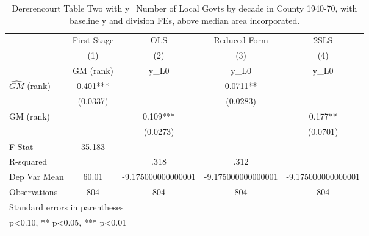 \begin{table}[htbp]\centering
\def\sym#1{\ifmmode^{#1}\else\(^{#1}\)\fi}
\caption{Dererencourt Table Two with y=Number of Local Govts by decade in County 1940-70, with baseline y and division FEs, above median area incorporated.}
\begin{tabular}{l*{4}{c}}
\toprule
                    & First Stage   &         OLS   &Reduced Form   &        2SLS   \\
                    &\multicolumn{1}{c}{(1)}&\multicolumn{1}{c}{(2)}&\multicolumn{1}{c}{(3)}&\multicolumn{1}{c}{(4)}\\
                    &\multicolumn{1}{c}{GM  (rank)}&\multicolumn{1}{c}{y\_L0}&\multicolumn{1}{c}{y\_L0}&\multicolumn{1}{c}{y\_L0}\\
\midrule
$\hat{GM}$ (rank)   &       0.401***&               &      0.0711** &               \\
                    &    (0.0337)   &               &    (0.0283)   &               \\
\addlinespace
GM  (rank)          &               &       0.109***&               &       0.177** \\
                    &               &    (0.0273)   &               &    (0.0701)   \\
\midrule
F-Stat              &      35.183   &               &               &               \\
R-squared           &               &        .318   &        .312   &               \\
Dep Var Mean        &       60.01   &-9.175000000000001   &-9.175000000000001   &-9.175000000000001   \\
Observations        &         804   &         804   &         804   &         804   \\
\bottomrule
\multicolumn{5}{l}{\footnotesize Standard errors in parentheses}\\
\multicolumn{5}{l}{\footnotesize * p<0.10, ** p<0.05, *** p<0.01}\\
\end{tabular}
\end{table}
